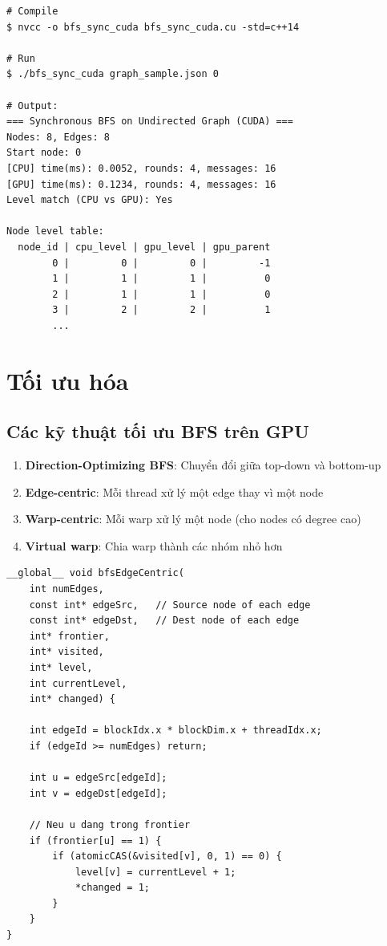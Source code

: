 \begin{lstlisting}[caption={Chạy chương trình BFS}, label={lst:run_bfs}]
# Compile
$ nvcc -o bfs_sync_cuda bfs_sync_cuda.cu -std=c++14

# Run
$ ./bfs_sync_cuda graph_sample.json 0

# Output:
=== Synchronous BFS on Undirected Graph (CUDA) ===
Nodes: 8, Edges: 8
Start node: 0
[CPU] time(ms): 0.0052, rounds: 4, messages: 16
[GPU] time(ms): 0.1234, rounds: 4, messages: 16
Level match (CPU vs GPU): Yes

Node level table:
  node_id | cpu_level | gpu_level | gpu_parent
        0 |         0 |         0 |         -1
        1 |         1 |         1 |          0
        2 |         1 |         1 |          0
        3 |         2 |         2 |          1
        ...
\end{lstlisting}

\section{Tối ưu hóa}

\subsection{Các kỹ thuật tối ưu BFS trên GPU}

\begin{enumerate}
    \item \textbf{Direction-Optimizing BFS}: Chuyển đổi giữa top-down và bottom-up
    \item \textbf{Edge-centric}: Mỗi thread xử lý một edge thay vì một node
    \item \textbf{Warp-centric}: Mỗi warp xử lý một node (cho nodes có degree cao)
    \item \textbf{Virtual warp}: Chia warp thành các nhóm nhỏ hơn
\end{enumerate}

\begin{lstlisting}[caption={Edge-centric BFS Kernel}, label={lst:edge_centric}]
__global__ void bfsEdgeCentric(
    int numEdges,
    const int* edgeSrc,   // Source node of each edge
    const int* edgeDst,   // Dest node of each edge
    int* frontier,
    int* visited,
    int* level,
    int currentLevel,
    int* changed) {
    
    int edgeId = blockIdx.x * blockDim.x + threadIdx.x;
    if (edgeId >= numEdges) return;
    
    int u = edgeSrc[edgeId];
    int v = edgeDst[edgeId];
    
    // Neu u dang trong frontier
    if (frontier[u] == 1) {
        if (atomicCAS(&visited[v], 0, 1) == 0) {
            level[v] = currentLevel + 1;
            *changed = 1;
        }
    }
}
\end{lstlisting}

